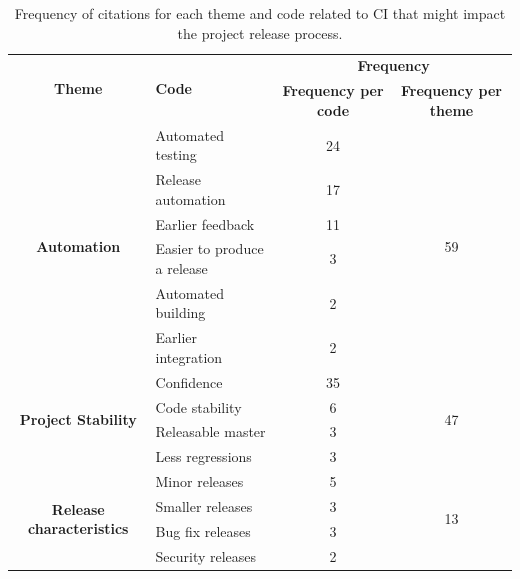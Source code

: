 \begin{table}
	\centering
	\caption{Frequency of citations for each theme and code related to CI that might impact the project release process.}
	\begin{tabular}{cp{9.25em}cc}
		\hline
		\multicolumn{1}{c}{\multirow{2}[4]{*}{\textbf{Theme}}} & \multirow{2}[4]{*}{\textbf{Code}} & \multicolumn{2}{p{10em}}{\textbf{Frequency}} \bigstrut\\
		\cline{3-4}          & \multicolumn{1}{c}{} & \multicolumn{1}{p{5em}}{\textbf{Frequency per code}} & \multicolumn{1}{p{5em}}{\textbf{Frequency per theme}} \bigstrut\\
		\hline
		\multicolumn{1}{c}{\multirow{6}[12]{*}{\textbf{Automation}}} & Automated testing & 24    & \multirow{6}[12]{*}{59} \bigstrut\\
		\cline{2-3}          & Release automation & 17    &  \bigstrut\\
		\cline{2-3}          & Earlier feedback & 11    &  \bigstrut\\
		\cline{2-3}          & Easier to produce a release & 3     &  \bigstrut\\
		\cline{2-3}          & Automated building & 2     &  \bigstrut\\
		\cline{2-3}          & Earlier integration & 2     &  \bigstrut\\
		\hline
		\multicolumn{1}{c}{\multirow{4}[8]{*}{\textbf{Project Stability}}} & Confidence & 35    & \multirow{4}[8]{*}{47} \bigstrut\\
		\cline{2-3}          & Code stability & 6     &  \bigstrut\\
		\cline{2-3}          & Releasable master & 3     &  \bigstrut\\
		\cline{2-3}          & Less regressions & 3     &  \bigstrut\\
		\hline
		\multicolumn{1}{c}{\multirow{4}[8]{*}{\textbf{Release characteristics}}} & Minor releases & 5     & \multirow{4}[8]{*}{13} \bigstrut\\
		\cline{2-3}          & Smaller releases & 3     &  \bigstrut\\
		\cline{2-3}          & Bug fix releases & 3     &  \bigstrut\\
		\cline{2-3}          & Security releases & 2     &  \bigstrut\\
		\hline
	\end{tabular}%
	\label{tab:CI_impacts_on_the_releasing_process}%
\end{table}%

